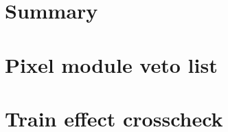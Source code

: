\section{Summary}





\clearpage
\appendix
\section{Pixel module veto list}
\label{sec:appendix1}

\section{Train effect crosscheck}
\label{sec:appendix2}



